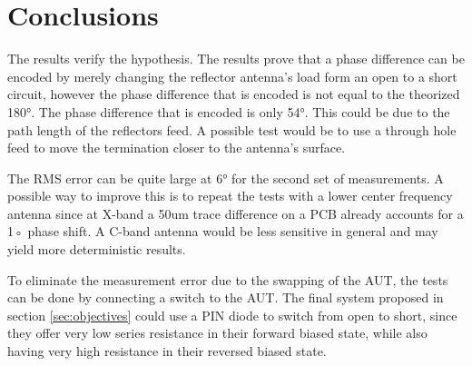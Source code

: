 %
%
%
\chapter{Conclusions \label{ch:conclusions}}
\vspace{0.5cm}

The results verify the hypothesis. The results prove that a phase difference can be encoded by merely changing the reflector antenna’s load form an open to a short circuit, however the phase difference that is encoded is not equal to the theorized 180°. The phase difference that is encoded is only 54°. This could be due to the path length of the reflectors feed. A possible test would be to use a through hole feed to move the termination closer to the antenna’s surface.

The RMS error can be quite large at 6° for the second set of measurements. A possible way to improve this is to repeat the tests with a lower center frequency antenna since at X-band a 50um trace difference on a PCB already accounts for a 1◦ phase shift. A C-band antenna would be less sensitive in general and may yield more deterministic results.

To eliminate the measurement error due to the swapping of the AUT, the tests can be done by connecting a switch to the AUT. The final system proposed in section \ref{sec:objectives} could use a PIN diode to switch from open to short, since they offer very low series resistance in their forward biased state, while also having very high resistance in their reversed biased state.

\ifstandalone

\printnoidxglossary[type=\acronymtype,nonumberlist]
\fi
%
